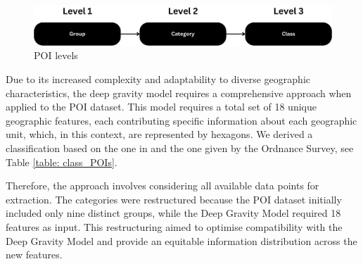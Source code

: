         \begin{figure}[H]
            \centering
            \includegraphics[width=12cm]{Images/POI_levels.png}
            \caption{POI levels}
            \label{fig: POI levels}
        \end{figure}


        Due to its increased complexity and adaptability to diverse geographic characteristics, the deep gravity model requires a comprehensive approach when applied to the POI dataset. This model requires a total set of 18 unique geographic features, each contributing specific information about each geographic unit, which, in this context, are represented by hexagons. 
        We derived a classification based on the one in \cite{siminiDeepGravityModel2021} and the one given by the Ordnance Survey, see Table \ref{table: class_POIs}. 

        Therefore, the approach involves considering all available data points for extraction. The categories were restructured because the POI dataset initially included only nine distinct groups, while the Deep Gravity Model required 18 features as input. This restructuring aimed to optimise compatibility with the Deep Gravity Model and provide an equitable information distribution across the new features.


